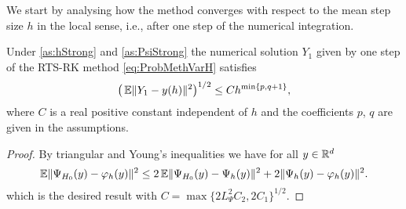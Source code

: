 \documentclass[final,onefignum,onetabnum]{siamonline171218}
\begin{document}
We start by analysing how the method converges with respect to the mean step size $h$ in the local sense, i.e., after one step of the numerical integration.
\begin{lemma}\label{thm:StrongOrderLocal} Under \cref{as:hStrong} and \cref{as:PsiStrong} the numerical solution $Y_1$ given by one step of the RTS-RK method \eqref{eq:ProbMethVarH} satisfies 
	\begin{equation}
		\big(\operatorname{\mathbb{E}}\lVert Y_1 - y(h)\rVert^2\big)^{1/2} \leq C h^{\min\{p, q + 1\}},
	\end{equation}
	where $C$ is a real positive constant independent of $h$ and the coefficients $p$, $q$ are given in the assumptions.
\end{lemma}
\begin{proof} By triangular and Young's inequalities we have for all $y \in \mathbb{R}^d$ 
	\begin{equation}
		\operatorname{\mathbb{E}}\lVert\Psi_{H_0}(y) - \varphi_h(y)\rVert^2 \leq 2\operatorname{\mathbb{E}}\lVert\Psi_{H_0}(y) - \Psi_h(y)\rVert^2 + 2\lVert\Psi_h(y) - \varphi_h(y)\rVert^2.
	\end{equation}		
	which is the desired result with $C = \max\{2L_{\Psi}^2 C_2, 2 C_1\}^{1/2}$.
\end{proof}
\end{document}
